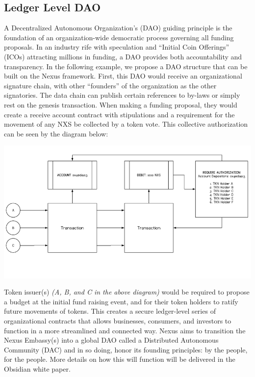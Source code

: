 \documentclass[11pt]{article}
\begin{document}
\subsection{Ledger Level DAO}

A Decentralized Autonomous Organization's (DAO) guiding principle is the foundation of an organization-wide democratic process governing all funding proposals.
In an industry rife with speculation and ``Initial Coin Offerings'' (ICOs) attracting millions in funding, a DAO provides both accountability and transparency.
In the following example, we propose a DAO structure that can be built on the Nexus framework.
First, this DAO would receive an organizational signature chain, with other ``founders'' of the organization as the other signatories.
The data chain can publish certain references to by-laws or simply rest on the genesis transaction.
When making a funding proposal, they would create a receive account contract with stipulations and a requirement for the movement of any NXS be collected by a token vote.
This collective authorization can be seen by the diagram below:

\hspace{-25pt}
\includegraphics[width=1.00\textwidth]{./images/rsz_dao.png}
\pagebreak

\noindent Token issuer(s) \textit{(A, B, and C in the above diagram)} would be required to propose a budget at the initial fund raising event, and for their token holders to ratify future movements of tokens.
This creates a secure ledger-level series of organizational contracts that allows businesses, consumers, and investors to function in a more streamlined and connected way.
Nexus aims to transition the Nexus Embassy(s) into a global DAO called a Distributed Autonomous Community (DAC) and in so doing, honor its founding principles: by the people, for the people.
More details on how this will function will be delivered in the Obsidian white paper.
\end{document}
